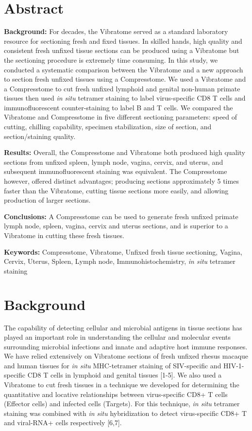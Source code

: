 \documentclass{article}
\begin{document}
\section*{Abstract}

\textbf{Background:} For decades, the Vibratome served as a standard laboratory resource for sectioning fresh and fixed tissues. In skilled hands, high quality and consistent fresh unfixed tissue sections can be produced using a Vibratome but the sectioning procedure is extremely time consuming. In this study, we conducted a systematic comparison between the Vibratome and a new approach to section fresh unfixed tissues using a Compresstome. We used a Vibratome and a Compresstome to cut fresh unfixed lymphoid and genital non-human primate tissues then used \textit{in situ} tetramer staining to label virus-specific CD8 T cells and immunofluorescent counter-staining to label B and T cells. We compared the Vibratome and Compresstome in five different sectioning parameters: speed of cutting, chilling capability, specimen stabilization, size of section, and section/staining quality.

\textbf{Results:} Overall, the Compresstome and Vibratome both produced high quality sections from unfixed spleen, lymph node, vagina, cervix, and uterus, and subsequent immunofluorescent staining was equivalent. The Compresstome however, offered distinct advantages; producing sections approximately 5 times faster than the Vibratome, cutting tissue sections more easily, and allowing production of larger sections.

\textbf{Conclusions:} A Compresstome can be used to generate fresh unfixed primate lymph node, spleen, vagina, cervix and uterus sections, and is superior to a Vibratome in cutting these fresh tissues.

\textbf{Keywords:} Compresstome, Vibratome, Unfixed fresh tissue sectioning, Vagina, Cervix, Uterus, Spleen, Lymph node, Immunohistochemistry, \textit{in situ} tetramer staining

\section*{Background}

The capability of detecting cellular and microbial antigens in tissue sections has played an important role in understanding the cellular and molecular events surrounding microbial infections and innate and adaptive host immune responses. We have relied extensively on Vibratome sections of fresh unfixed rhesus macaque and human tissues for \textit{in situ} MHC-tetramer staining of SIV-specific and HIV-1-specific CD8 T cells in lymphoid and genital tissues [1-5]. We also used a Vibratome to cut fresh tissues in a technique we developed for determining the quantitative and locative relationships between virus-specific CD8+ T cells (Effector cells) and infected cells (Targets). For this technique, \textit{in situ} tetramer staining was combined with \textit{in situ} hybridization to detect virus-specific CD8+ T and viral-RNA+ cells respectively [6,7].
\end{document}

